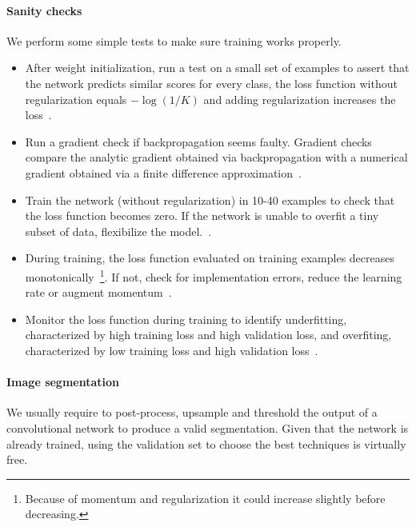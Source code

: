 \paragraph{Sanity checks}
We perform some simple tests to make sure training works properly.
\begin{itemize}
	\item After weight initialization, run a test on a small set of examples to assert that the network predicts similar scores for every class, the loss function without regularization equals $-\log(1/K)$ and adding regularization increases the loss~\cite{Karpathy2016}.

	\item Run a gradient check if backpropagation seems faulty. Gradient checks compare the analytic gradient obtained via backpropagation with a numerical gradient obtained via a finite difference approximation~\cite{Karpathy2016}.

	\item Train the network (without regularization) in 10-40 examples to check that the loss function becomes zero. If the network is unable to overfit a tiny subset of data, flexibilize the model.~\cite{Ng2014}.

	\item During training, the loss function evaluated on training examples decreases monotonically~\footnote{Because of momentum and regularization it could increase slightly before decreasing.}. If not, check for implementation errors, reduce the learning rate or augment momentum~\cite{Karpathy2016}.

	\item Monitor the loss function during training to identify underfitting, characterized by high training loss and high validation loss, and overfiting, characterized by low training loss and high validation loss~\cite{Ng2014}.
\end{itemize}

\paragraph{Image segmentation} We usually require to post-process, upsample and threshold the output of a convolutional network to produce a valid segmentation. 
Given that the network is already trained, using the validation set to choose the best techniques is virtually free.%

